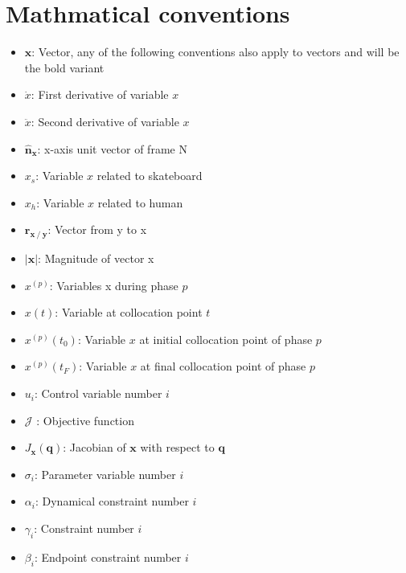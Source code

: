 \documentclass[twocolumn,10pt,twoside]{asme2ej}
\begin{document}
\section*{Mathmatical conventions}
\large \begin{itemize}
    \item{$\mathbf{x}$}: Vector, any of the following conventions also apply to vectors and will be the bold variant
    \item{$\dot x$:} First derivative of variable $x$
    \item{$\ddot x$:} Second derivative of variable $x$
    \item{$\mathbf{\hat n_x}$:} x-axis unit vector of frame N 
    \item{$x_s$:} Variable $x$ related to skateboard
    \item{$x_h$:} Variable $x$ related to human
    \item{$\mathbf{r_{x \mathbin{/} y}}$:} Vector from y to x
    \item{$|\mathbf{x}|$:} Magnitude of vector x

    \item{$x^{(p)}$:} Variables x during phase $p$
    \item{$x(t)$:} Variable at collocation point $t$
    \item{$x^{(p)}(t_0)$:} Variable $x$ at initial collocation point of phase $p$
    \item{$x^{(p)}(t_F)$:} Variable $x$ at final collocation point of phase $p$
    \item{$u_i$:} Control variable number $i$
    \item{$\mathcal{J}$ :} Objective function
    \item{$J_{\mathbf{x}}(\mathbf{q})$:} Jacobian of $\mathbf{x}$ with respect to $\mathbf{q}$
    \item{$\sigma_i$:} Parameter variable number $i$
    \item{$\alpha_i$:} Dynamical constraint number $i$
    \item{$\gamma_i$:} Constraint number $i$
    \item{$\beta_i$:} Endpoint constraint number $i$
\end{itemize}
\normalsize
\newpage
\twocolumn
\end{document}
